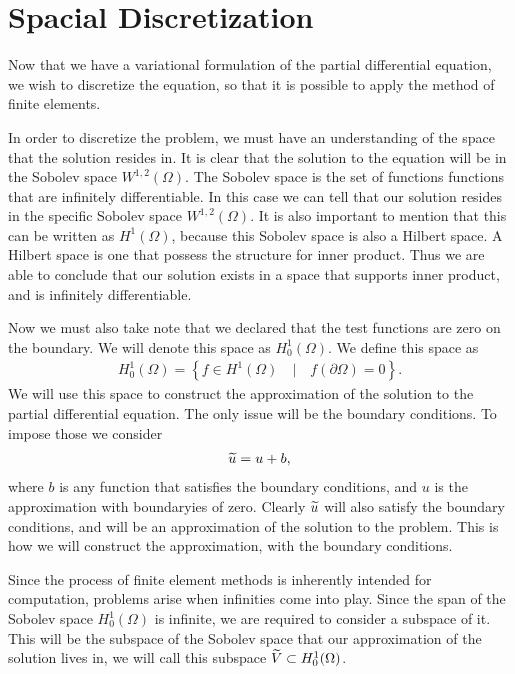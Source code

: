 \documentclass[../fem.tex]{subfile}
\begin{document}
\section{Spacial Discretization}%
\label{sec:spacial_discretization}


Now that we have a variational formulation of the partial differential
equation, we wish to discretize the equation, so that it is possible to apply
the method of finite elements.

In order to discretize the problem, we must have an understanding of the space
that the solution resides in. It is clear that the solution to the equation
will be in the Sobolev space $W^{1,2}(\Omega)$. The Sobolev space is the set of
functions functions that are infinitely differentiable. In this case we can tell
that our solution resides in the specific Sobolev space $W^{1,2}(\Omega)$. It
is also important to mention that this can be written as $H^1(\Omega)$, because
this Sobolev space is also a Hilbert space. A Hilbert space is one that possess
the structure for inner product. Thus we are able to conclude that our solution
exists in a space that supports inner product, and is infinitely
differentiable.

Now we must also take note that we declared that the test functions are zero on
the boundary. We will denote this space as $H^1_0(\Omega)$. We define this
space as
\begin{align*}
  H^1_0(\Omega)=\left\{f\in H^1(\Omega)\quad \vert\quad
  f(\partial\Omega)=0\right\}.
\end{align*}
We will use this space to construct the approximation of the solution to the
partial differential equation. The only issue will be the boundary conditions.
To impose those we consider
\begin{align*}
  \widetilde{u}=u+b,
\end{align*}
where $b$ is any function that satisfies the boundary conditions, and $u$ is
the approximation with boundaryies of zero. Clearly $\widetilde{u}$ will also satisfy
the boundary conditions, and will be an approximation of the solution to the
problem. This is how we will construct the approximation, with the boundary
conditions.

Since the process of finite element methods is inherently intended for
computation, problems arise when infinities come into play. Since the span of
the Sobolev space $H^1_0(\Omega)$ is infinite, we are required to consider a
subspace of it. This will be the subspace of the Sobolev space that our
approximation of the solution lives in, we will call this subspace
$\widetilde{V}\subset H^1_0(\Omega)$.
\end{document}
